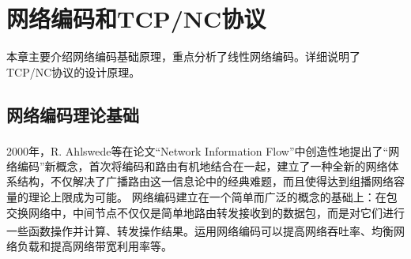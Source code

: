 \chapter{网络编码和TCP/NC协议}
本章主要介绍网络编码基础原理，重点分析了线性网络编码。详细说明了TCP/NC协议的设计原理。
\section{网络编码理论基础}
2000年，R. Ahlswede等在论文“Network Information Flow”\textsuperscript{\cite{Ahlswede2000}}中创造性地提出了“网络编码”新概念，首次将编码和路由有机地结合在一起，建立了一种全新的网络体系结构，不仅解决了广播路由这一信息论中的经典难题，而且使得达到组播网络容量的理论上限成为可能。
网络编码建立在一个简单而广泛的概念的基础上：在包交换网络中，中间节点不仅仅是简单地路由转发接收到的数据包，而是对它们进行一些函数操作并计算、转发操作结果\textsuperscript{\cite{梅达尔2014网络编码基础与应用}}。运用网络编码可以提高网络吞吐率、均衡网络负载和提高网络带宽利用率等。
